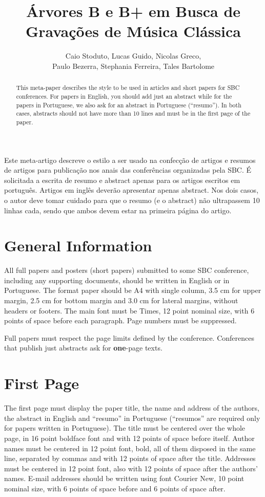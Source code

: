 \documentclass[12pt]{article}
\title{Árvores B e B+ em Busca de Gravações de Música Clássica\\}
\author{Caio Stoduto\inst{1}, Lucas Guido\inst{1}, Nicolas Greco\inst{1},\\
Paulo Bezerra\inst{1}, Stephania Ferreira\inst{1}, Tales Bartolome\inst{1}}
\begin{document}
 

\maketitle

\begin{abstract}
  This meta-paper describes the style to be used in articles and short papers
  for SBC conferences. For papers in English, you should add just an abstract
  while for the papers in Portuguese, we also ask for an abstract in
  Portuguese (``resumo''). In both cases, abstracts should not have more than
  10 lines and must be in the first page of the paper.
\end{abstract}
     
\begin{resumo} 
  Este meta-artigo descreve o estilo a ser usado na confecção de artigos e
  resumos de artigos para publicação nos anais das conferências organizadas
  pela SBC. É solicitada a escrita de resumo e abstract apenas para os artigos
  escritos em português. Artigos em inglês deverão apresentar apenas abstract.
  Nos dois casos, o autor deve tomar cuidado para que o resumo (e o abstract)
  não ultrapassem 10 linhas cada, sendo que ambos devem estar na primeira
  página do artigo.
\end{resumo}


\section{General Information}

All full papers and posters (short papers) submitted to some SBC conference,
including any supporting documents, should be written in English or in
Portuguese. The format paper should be A4 with single column, 3.5 cm for upper
margin, 2.5 cm for bottom margin and 3.0 cm for lateral margins, without
headers or footers. The main font must be Times, 12 point nominal size, with 6
points of space before each paragraph. Page numbers must be suppressed.

Full papers must respect the page limits defined by the conference.
Conferences that publish just abstracts ask for \textbf{one}-page texts.

\section{First Page} \label{sec:firstpage}

The first page must display the paper title, the name and address of the
authors, the abstract in English and ``resumo'' in Portuguese (``resumos'' are
required only for papers written in Portuguese). The title must be centered
over the whole page, in 16 point boldface font and with 12 points of space
before itself. Author names must be centered in 12 point font, bold, all of
them disposed in the same line, separated by commas and with 12 points of
space after the title. Addresses must be centered in 12 point font, also with
12 points of space after the authors' names. E-mail addresses should be
written using font Courier New, 10 point nominal size, with 6 points of space
before and 6 points of space after.
\end{document}
